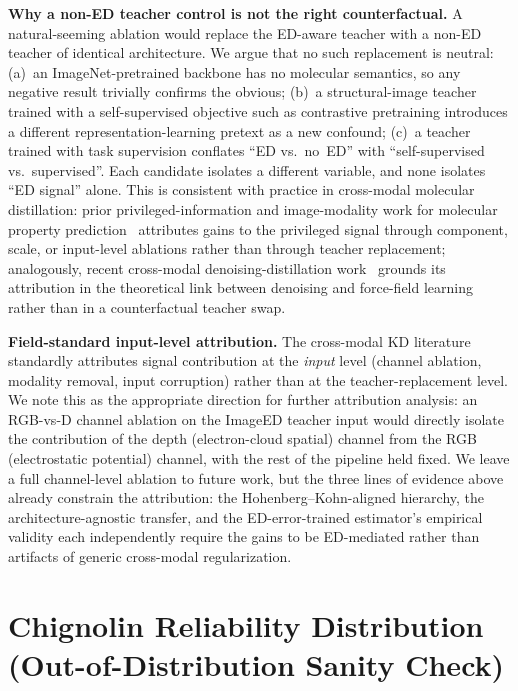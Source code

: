 \textbf{Why a non-ED teacher control is not the right counterfactual.} A natural-seeming ablation would replace the ED-aware teacher with a non-ED teacher of identical architecture. We argue that no such replacement is neutral: (a)~an ImageNet-pretrained backbone has no molecular semantics, so any negative result trivially confirms the obvious; (b)~a structural-image teacher trained with a self-supervised objective such as contrastive pretraining introduces a different representation-learning pretext as a new confound; (c)~a teacher trained with task supervision conflates ``ED vs.~no~ED'' with ``self-supervised vs.~supervised''. Each candidate isolates a different variable, and none isolates ``ED signal'' alone. This is consistent with practice in cross-modal molecular distillation: prior privileged-information and image-modality work for molecular property prediction~\cite{xiang2024iem,zeng2022accurate,sunshine2023chemical} attributes gains to the privileged signal through component, scale, or input-level ablations rather than through teacher replacement; analogously, recent cross-modal denoising-distillation work~\cite{cho2025denoisers} grounds its attribution in the theoretical link between denoising and force-field learning~\cite{zaidi2022pretraining} rather than in a counterfactual teacher swap.

\textbf{Field-standard input-level attribution.} The cross-modal KD literature standardly attributes signal contribution at the \emph{input} level (channel ablation, modality removal, input corruption) rather than at the teacher-replacement level. We note this as the appropriate direction for further attribution analysis: an RGB-vs-D channel ablation on the ImageED teacher input would directly isolate the contribution of the depth (electron-cloud spatial) channel from the RGB (electrostatic potential) channel, with the rest of the pipeline held fixed. We leave a full channel-level ablation to future work, but the three lines of evidence above already constrain the attribution: the Hohenberg--Kohn-aligned hierarchy, the architecture-agnostic transfer, and the ED-error-trained estimator's empirical validity each independently require the gains to be ED-mediated rather than artifacts of generic cross-modal regularization.


\section{Chignolin Reliability Distribution (Out-of-Distribution Sanity Check)}
\label{sec:appendix_chignolin_sanity}

